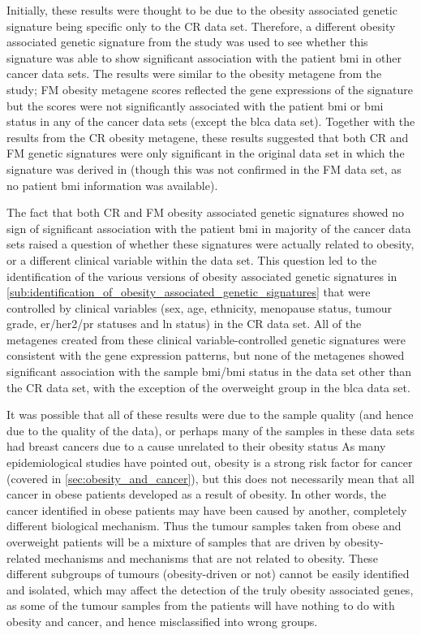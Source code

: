 Initially, these results were thought to be due to the obesity associated genetic signature being specific only to the CR data set.
Therefore, a different obesity associated genetic signature from the \citet{Fuentes-Mattei2014} study was used to see whether this signature was able to show significant association with the patient \gls{bmi} in other cancer data sets.
The results were similar to the obesity metagene from the \citet{Creighton2012} study; FM obesity metagene scores reflected the gene expressions of the signature but the scores were not significantly associated with the patient \gls{bmi} or \gls{bmi} status in any of the cancer data sets (except the \gls{blca} data set).
Together with the results from the CR obesity metagene, these results suggested that both CR and FM genetic signatures were only significant in the original data set in which the signature was derived in (though this was not confirmed in the FM data set, as no patient \gls{bmi} information was available).

The fact that both CR and FM obesity associated genetic signatures showed no sign of significant association with the patient \gls{bmi} in majority of the cancer data sets raised a question of whether these signatures were actually related to obesity, or a different clinical variable within the data set.
This question led to the identification of the various versions of obesity associated genetic signatures in \cref{sub:identification_of_obesity_associated_genetic_signatures} that were controlled by clinical variables (sex, age, ethnicity, menopause status, tumour grade, \gls{er}/\gls{her2}/\gls{pr} statuses and \gls{ln} status) in the CR data set.
All of the metagenes created from these clinical variable-controlled genetic signatures were consistent with the gene expression patterns, but none of the metagenes showed significant association with the sample \gls{bmi}/\gls{bmi} status in the data set other than the CR data set, with the exception of the overweight group in the \gls{blca} data set.

It was possible that all of these results were due to the sample quality (and hence due to the quality of the data), or perhaps many of the samples in these data sets had breast cancers due to a cause unrelated to their obesity status
As many epidemiological studies have pointed out, obesity is a strong risk factor for cancer (covered in \cref{sec:obesity_and_cancer}), but this does not necessarily mean that all cancer in obese patients developed as a result of obesity.
In other words, the cancer identified in obese patients may have been caused by another, completely different biological mechanism.
Thus the tumour samples taken from obese and overweight patients will be a mixture of samples that are driven by obesity-related mechanisms and mechanisms that are not related to obesity.
These different subgroups of tumours (obesity-driven or not) cannot be easily identified and isolated, which may affect the detection of the truly obesity associated genes, as some of the tumour samples from the patients will have nothing to do with obesity and cancer, and hence misclassified into wrong groups.

